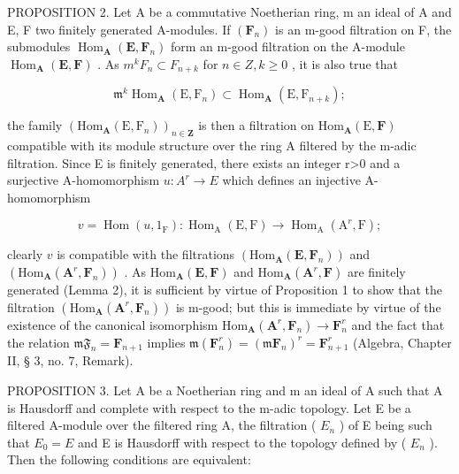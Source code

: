 PROPOSITION 2. Let A be a commutative Noetherian ring, m an ideal of A and E, F two finitely generated A-modules. If \((\mathbf{F}_{n})\) is an m-good filtration on F, the submodules \(\operatorname{Hom}_{\mathbf{A}}(\mathbf{E}, \mathbf{F}_{n})\) form an m-good filtration on the A-module \(\operatorname{Hom}_{\mathbf{A}}(\mathbf{E}, \mathbf{F})\) . As \(m^{k}F_{n}\subset F_{n+k}\) for \(n\in Z, k\geqslant0\) , it is also true that

\[
\mathfrak {m} ^ {k} \operatorname{Hom} _ {\mathbf {A}} (\mathrm{E}, \mathrm{F} _ {n}) \subset \operatorname{Hom} _ {\mathbf {A}} (\mathrm{E}, \mathrm{F} _ {n + k});
\]

the family \((\mathrm{Hom}_{\mathbf{A}}(\mathrm{E},\mathrm{F}_{n}))_{n\in\mathbf{Z}}\) is then a filtration on \(\mathrm{Hom}_{\mathbf{A}}(\mathrm{E},\mathbf{F})\) compatible with its module structure over the ring A filtered by the m-adic filtration. Since E is finitely generated, there exists an integer r\textgreater0 and a surjective A-homomorphism \(u:A^{r}\rightarrow E\) which defines an injective A-homomorphism

\[
v = \operatorname{Hom} (u, 1 _ {\mathrm{F}}): \operatorname{Hom} _ {\mathrm{A}} (\mathrm{E}, \mathrm{F}) \rightarrow \operatorname{Hom} _ {\mathrm{A}} (\mathrm{A} ^ {r}, \mathrm{F});
\]

clearly \(v\) is compatible with the filtrations \((\mathrm{Hom}_{\mathbf{A}}(\mathbf{E},\mathbf{F}_n))\) and \((\mathrm{Hom}_{\mathbf{A}}(\mathbf{A}^r,\mathbf{F}_n))\) . As \(\mathrm{Hom}_{\mathbf{A}}(\mathbf{E},\mathbf{F})\) and \(\mathrm{Hom}_{\mathbf{A}}(\mathbf{A}^r,\mathbf{F})\) are finitely generated (Lemma 2), it is sufficient by virtue of Proposition 1 to show that the filtration \((\mathrm{Hom}_{\mathbf{A}}(\mathbf{A}^{r},\mathbf{F}_{n}))\) is m-good; but this is immediate by virtue of the existence of the canonical isomorphism \(\mathrm{Hom}_{\mathbf{A}}(\mathbf{A}^{r},\mathbf{F}_{n})\to \mathbf{F}_{n}^{r}\) and the fact that the relation \(\mathfrak{mF}_n = \mathbf{F}_{n + 1}\) implies \(\mathfrak{m}(\mathbf{F}_n^r) = (\mathfrak{m}\mathbf{F}_n)^r = \mathbf{F}_{n + 1}^r\) (Algebra, Chapter II, § 3, no. 7, Remark).

PROPOSITION 3. Let A be a Noetherian ring and m an ideal of A such that A is Hausdorff and complete with respect to the m-adic topology. Let E be a filtered A-module over the filtered ring A, the filtration ( \(E_{n}\) ) of E being such that \(E_{0} = E\) and E is Hausdorff with respect to the topology defined by ( \(E_{n}\) ). Then the following conditions are equivalent:

